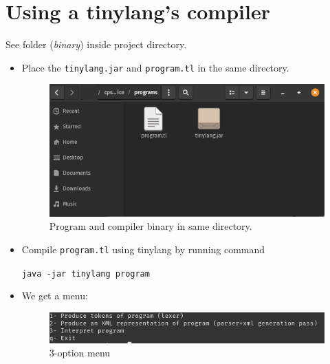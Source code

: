 \section{Using a tinylang's compiler}
See folder (\emph{binary}) inside project directory.
\begin{itemize}
    \item Place the \verb!tinylang.jar! and \verb!program.tl! in the same directory.
    \begin{figure}[H]
        \centering
        \includegraphics[scale=0.5]{Introduction/images/same_directory.png}
        \caption{Program and compiler binary in same directory.}
        \label{fig:placed in the same directory}
    \end{figure}
    \item Compile \verb!program.tl! using tinylang by running command 
    
    \verb!java -jar tinylang program!
    \item We get a menu:
    \begin{figure}[H]
        \centering
        \includegraphics[scale=0.6]{Introduction/images/menu.png}
        \caption{3-option menu}
        \label{fig:3optionmenu}
    \end{figure}


\end{itemize}
